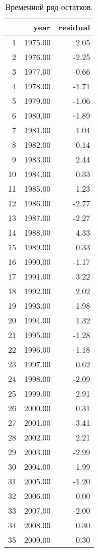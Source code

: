 \begin{table}[H]
\centering
\begin{tabular}{rrr}
  \hline
 & year & residual \\ 
  \hline
1 & 1975.00 & 2.05 \\ 
  2 & 1976.00 & -2.25 \\ 
  3 & 1977.00 & -0.66 \\ 
  4 & 1978.00 & -1.71 \\ 
  5 & 1979.00 & -1.06 \\ 
  6 & 1980.00 & -1.89 \\ 
  7 & 1981.00 & 1.04 \\ 
  8 & 1982.00 & 0.14 \\ 
  9 & 1983.00 & 2.44 \\ 
  10 & 1984.00 & 0.33 \\ 
  11 & 1985.00 & 1.23 \\ 
  12 & 1986.00 & -2.77 \\ 
  13 & 1987.00 & -2.27 \\ 
  14 & 1988.00 & 4.33 \\ 
  15 & 1989.00 & 0.33 \\ 
  16 & 1990.00 & -1.17 \\ 
  17 & 1991.00 & 3.22 \\ 
  18 & 1992.00 & 2.02 \\ 
  19 & 1993.00 & -1.98 \\ 
  20 & 1994.00 & 1.32 \\ 
  21 & 1995.00 & -1.28 \\ 
  22 & 1996.00 & -1.18 \\ 
  23 & 1997.00 & 0.62 \\ 
  24 & 1998.00 & -2.09 \\ 
  25 & 1999.00 & 2.91 \\ 
  26 & 2000.00 & 0.31 \\ 
  27 & 2001.00 & 3.41 \\ 
  28 & 2002.00 & 2.21 \\ 
  29 & 2003.00 & -2.99 \\ 
  30 & 2004.00 & -1.99 \\ 
  31 & 2005.00 & -1.20 \\ 
  32 & 2006.00 & 0.00 \\ 
  33 & 2007.00 & -2.00 \\ 
  34 & 2008.00 & 0.30 \\ 
  35 & 2009.00 & 0.30 \\ 
   \hline
\end{tabular}
\caption{Временной ряд остатков.} 
\label{table:residuals}
\end{table}
